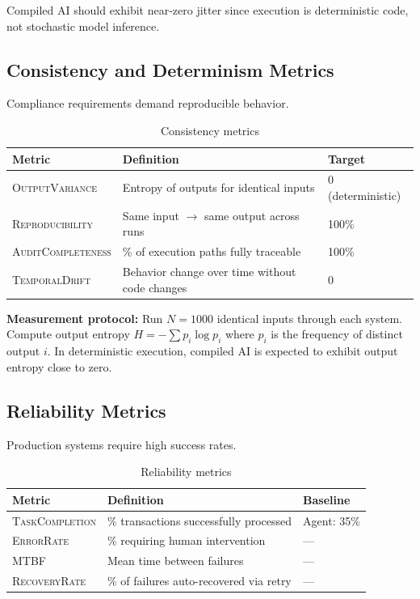 \documentclass[11pt]{article}
\newcommand{\metric}[1]{\textsc{#1}}
\begin{document}
Compiled AI should exhibit near-zero jitter since execution is deterministic code, not stochastic model inference.

\subsection{Consistency and Determinism Metrics}

Compliance requirements demand reproducible behavior.

\begin{table}[ht]
\centering
\caption{Consistency metrics}
\label{tab:consistency-metrics}
\begin{tabular}{p{3.5cm}p{5cm}p{3.5cm}}
\toprule
Metric & Definition & Target \\
\midrule
\metric{OutputVariance} & Entropy of outputs for identical inputs & 0 (deterministic) \\
\metric{Reproducibility} & Same input $\rightarrow$ same output across runs & 100\% \\
\metric{AuditCompleteness} & \% of execution paths fully traceable & 100\% \\
\metric{TemporalDrift} & Behavior change over time without code changes & 0 \\
\bottomrule
\end{tabular}
\end{table}

\textbf{Measurement protocol:} Run $N=1000$ identical inputs through each system. Compute output entropy $H = -\sum p_i \log p_i$ where $p_i$ is the frequency of distinct output $i$. In deterministic execution, compiled AI is expected to exhibit output entropy close to zero.

\subsection{Reliability Metrics}

Production systems require high success rates.

\begin{table}[ht]
\centering
\caption{Reliability metrics}
\label{tab:reliability-metrics}
\begin{tabular}{p{3.5cm}p{5.5cm}p{3cm}}
\toprule
Metric & Definition & Baseline \\
\midrule
\metric{TaskCompletion} & \% transactions successfully processed & Agent: 35\% \\
\metric{ErrorRate} & \% requiring human intervention & --- \\
\metric{MTBF} & Mean time between failures & --- \\
\metric{RecoveryRate} & \% of failures auto-recovered via retry & --- \\
\bottomrule
\end{tabular}
\end{table}
\end{document}

